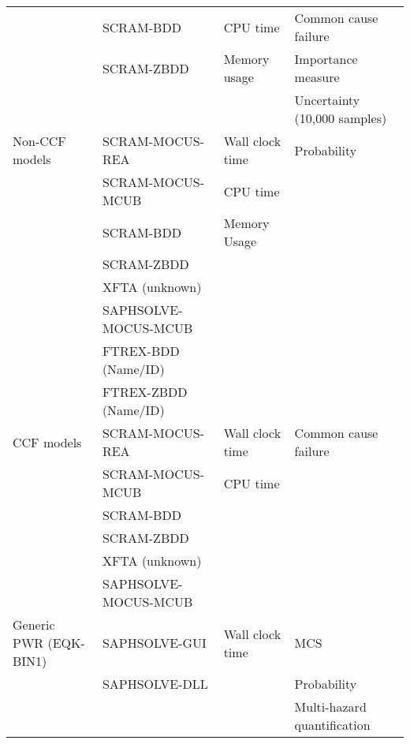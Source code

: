 \begin{longtable}{llll}
    & SCRAM-BDD & CPU time &  Common cause failure \\
    & SCRAM-ZBDD & Memory usage &  Importance measure \\
    & & & Uncertainty (10,000 samples) \\
\midrule
Non-CCF models  & SCRAM-MOCUS-REA & Wall clock time & Probability \\
                & SCRAM-MOCUS-MCUB & CPU time & \\
                & SCRAM-BDD & Memory Usage & \\
                & SCRAM-ZBDD & & \\
                & XFTA (unknown) &  &  \\
                & SAPHSOLVE-MOCUS-MCUB &  &  \\
                & FTREX-BDD (Name/ID) &  &  \\
                & FTREX-ZBDD (Name/ID) &  & \\
\midrule
CCF models  & SCRAM-MOCUS-REA & Wall clock time & Common cause failure \\
            & SCRAM-MOCUS-MCUB & CPU time & \\
            & SCRAM-BDD & & \\
            & SCRAM-ZBDD & & \\
            & XFTA (unknown) & &  \\
            & SAPHSOLVE-MOCUS-MCUB &  &  \\
\midrule
Generic PWR (EQK-BIN1) & SAPHSOLVE-GUI & Wall clock time & MCS \\ 
                       & SAPHSOLVE-DLL & & Probability \\
                       & & & Multi-hazard quantification \\
\bottomrule
\end{longtable}